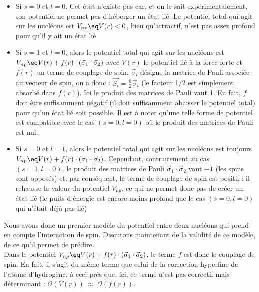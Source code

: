 \begin{itemize}[label=$\bullet$]

    \item Si $s=0$ et $l=0$. Cet état n'existe pas car, et on le sait expérimentalement, son potentiel ne permet pas d'héberger un état lié. Le potentiel total qui agit sur les nucléons est $V_{np} \eq V(r)<0$, bien qu'attractif, n'est pas assez profond pour qu'il y ait un état lié\\[4pt]
    
    \item Si $s=1$ et $l=0$, alors le potentiel total qui agit sur les nucléons est $V_{np} \eq V(r) + f(r) \cdot (\vec{\sigma}_1 \cdot \vec{\sigma}_2)$ avec $V(r)$ le potentiel lié à la force forte et $f(r)$ un terme de couplage de spin. $\vec{\sigma}_i$ désigne la matrice de Pauli associée au vecteur de spin, on a donc : $\vec{S_i} = \frac{\hbar}{2}\vec{\sigma}_i$ (le facteur 1/2 est simplement absorbé dans $f(r)$). Ici le produit des matrices de Pauli vaut 1.  En fait, $f$ doit être suffisamment négatif (il doit suffisamment abaisser le potentiel total) pour qu'un état lié soit possible. Il est à noter qu'une telle forme de potentiel est compatible avec le cas $(s=0,l=0)$ où le produit des matrices de Pauli est nul.\\[4pt]
    
    \item  Si $s=0$ et $l=1$, alors le potentiel total qui agit sur les nucléons est toujours $V_{np} \eq V(r) + f(r) \cdot (\vec{\sigma}_1 \cdot \vec{\sigma}_2)$. Cependant, contrairement au cas $(s=1,l=0)$, le produit des matrices de Pauli $\vec{\sigma}_1 \cdot \vec{\sigma}_2$ vaut $-1$ (les spins sont opposés) et, par conséquent, le terme de couplage de spin est positif : il rehausse la valeur du potentiel $V_{np}$, ce qui ne permet donc pas de créer un état lié (le puits d'énergie est encore moins profond que le cas $(s=0,l=0)$ qui n'était déjà pas lié)\\[4pt] 
    
\end{itemize}

Nous avons donc un premier modèle du potentiel entre deux nucléons qui prend en compte l'interaction de spin. Discutons maintenant de la validité de ce modèle, de ce qu'il permet de prédire.\\

Dans le potentiel $V_{np} \eq V(r) + f(r) \cdot (\vec{\sigma}_1 \cdot \vec{\sigma}_2)$, le terme $f$ est donc le couplage de spin. En fait, il s'agit du même terme que celui de la correction hyperfine de l'atome d'hydrogène, à ceci près que, ici, ce terme n'est pas correctif mais déterminant : $\mathcal{O}(V(r)) \;\approx\; \mathcal{O}(f(r))$.

